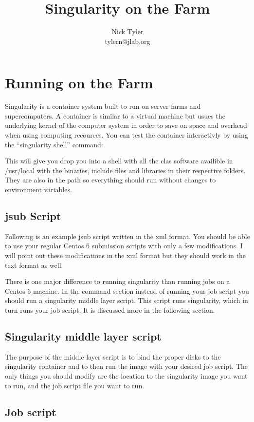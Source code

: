 \documentclass[12pt]{report}
\title{Singularity on the Farm}
\author{Nick Tyler \\ tylern@jlab.org}
\begin{document}
\maketitle

\section*{Running on the Farm}
Singularity is a container system built to run on server farms and 
supercomputers. A container is similar to a virtual machine but usues the 
underlying kernel of the computer system in order to save on space and overhead 
when using computing recources.  You can test the container interactivly by 
using the ``singularity shell'' command:


This will give you drop you into a shell with all the clas software availible in /usr/local
with the binaries, include files and libraries in their respective folders. They  
are also in the path so everything should run without changes to environment 
variables.

\subsection*{jsub Script}
\quad Following is an example jsub script written in the xml format.  You should 
be able to use your regular Centos 6 submission scripts with only a few modifications. I will 
point out these modifications in the xml format but they should work in the text format as well.


There is one major difference to running singularity than running jobs on a Centos 6 machine. 
In the command section instead of running your job script you should run a singularity middle layer script. 
This script runs singularity, which in turn runs your job script. It is discussed more in the following section.


\subsection*{Singularity middle layer script}
\quad The purpose of the middle layer script is to bind the proper disks to the 
singularity container and to then run the image with your desired job script. 
The only things you should modify are the location to the singularity image you want to run, 
and the job script file you want to run.



\subsection*{Job script}

\pagebreak
\end{document}
